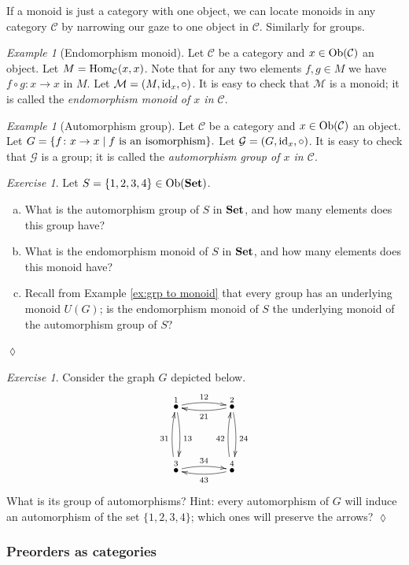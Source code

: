 \documentclass{book}
\def\tn{\textnormal}
\def\mc{\mathcal}
\def\Hom{\tn{Hom}}
\def\Ob{\tn{Ob}}
\def\to{\rightarrow}
\def\taking{\colon}
\def\|{{\;|\;}}
\newcommand{\LMO}[1]{\stackrel{#1}{\bullet}}
\def\id{\tn{id}}
\def\Set{{\bf Set}}
\def\mcC{\mc{C}}
\def\mcG{\mc{G}}
\def\mcM{\mc{M}}
\theoremstyle{remark}
\newtheorem{example}[subsubsection]{Example}
\newtheorem{exc}[subsubsection]{Exercise}
\newenvironment{exercise}{\begin{exc}}{\hspace*{\fill}$\lozenge$\end{exc}}
\theoremstyle{definition}
\def\sexc{\begin{enumerate}[a.)]\setlength{\itemsep}{.1cm}\setlength{\parskip}{.1cm}\item}
\def\next{\item}
\def\endsexc{\end{enumerate}}
\begin{document}
If a monoid is just a category with one object, we can locate monoids in any category $\mcC$ by narrowing our gaze to one object in $\mcC$. Similarly for groups.

\begin{example}[Endomorphism monoid]

Let $\mcC$ be a category and $x\in\Ob(\mcC)$ an object. Let $M=\Hom_\mcC(x,x)$. Note that for any two elements $f,g\in M$ we have $f\circ g\taking x\to x$ in $M$. Let $\mcM=(M,\id_x,\circ)$. It is easy to check that $\mcM$ is a monoid; it is called the {\em endomorphism monoid of $x$ in $\mcC$}.

\end{example}

\begin{example}[Automorphism group]

Let $\mcC$ be a category and $x\in\Ob(\mcC)$ an object. Let $G=\{f\taking x\to x\|f\tn{ is an isomorphism}\}.$ Let $\mcG=(G,\id_x,\circ)$. It is easy to check that $\mcG$ is a group; it is called the {\em automorphism group of $x$ in $\mcC$}.

\end{example}

\begin{exercise}
Let $S=\{1,2,3,4\}\in\Ob(\Set)$.
\sexc What is the automorphism group of $S$ in $\Set$, and how many elements does this group have?
\next What is the endomorphism monoid of $S$ in $\Set$, and how many elements does this monoid have? 
\next Recall from Example \ref{ex:grp to monoid} that every group has an underlying monoid $U(G)$; is the endomorphism monoid of $S$ the underlying monoid of the automorphism group of $S$?
\endsexc
\end{exercise}

\begin{exercise}\label{exc:symmetric square}
Consider the graph $G$ depicted below. 
$$
\xymatrix@=40pt{
\LMO{1}\ar@/^.3pc/[r]^{12}\ar@/^.3pc/[d]^{13}&\LMO{2}\ar@/^.3pc/[d]^{24}\ar@/^.3pc/[l]^{21}\\
\LMO{3}\ar@/^.3pc/[r]^{34}\ar@/^.3pc/[u]^{31}&\LMO{4}\ar@/^.3pc/[u]^{42}\ar@/^.3pc/[l]^{43}
}
$$
What is its group of automorphisms? Hint: every automorphism of $G$ will induce an automorphism of the set $\{1,2,3,4\}$; which ones will preserve the arrows?
\end{exercise}


\subsubsection{Preorders as categories}\label{sec:preorder as cat}
\end{document}
